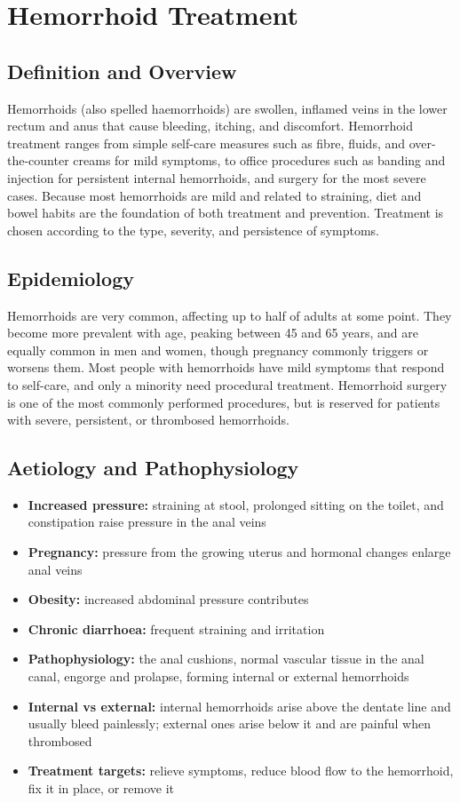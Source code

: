 \chapter{Hemorrhoid Treatment}

\section*{Definition and Overview}
Hemorrhoids (also spelled haemorrhoids) are swollen, inflamed veins in the lower rectum and anus that cause bleeding, itching, and discomfort. Hemorrhoid treatment ranges from simple self-care measures such as fibre, fluids, and over-the-counter creams for mild symptoms, to office procedures such as banding and injection for persistent internal hemorrhoids, and surgery for the most severe cases. Because most hemorrhoids are mild and related to straining, diet and bowel habits are the foundation of both treatment and prevention. Treatment is chosen according to the type, severity, and persistence of symptoms.

\section*{Epidemiology}
Hemorrhoids are very common, affecting up to half of adults at some point. They become more prevalent with age, peaking between 45 and 65 years, and are equally common in men and women, though pregnancy commonly triggers or worsens them. Most people with hemorrhoids have mild symptoms that respond to self-care, and only a minority need procedural treatment. Hemorrhoid surgery is one of the most commonly performed procedures, but is reserved for patients with severe, persistent, or thrombosed hemorrhoids.

\section*{Aetiology and Pathophysiology}
\begin{itemize}
    \item \textbf{Increased pressure:} straining at stool, prolonged sitting on the toilet, and constipation raise pressure in the anal veins
    \item \textbf{Pregnancy:} pressure from the growing uterus and hormonal changes enlarge anal veins
    \item \textbf{Obesity:} increased abdominal pressure contributes
    \item \textbf{Chronic diarrhoea:} frequent straining and irritation
    \item \textbf{Pathophysiology:} the anal cushions, normal vascular tissue in the anal canal, engorge and prolapse, forming internal or external hemorrhoids
    \item \textbf{Internal vs external:} internal hemorrhoids arise above the dentate line and usually bleed painlessly; external ones arise below it and are painful when thrombosed
    \item \textbf{Treatment targets:} relieve symptoms, reduce blood flow to the hemorrhoid, fix it in place, or remove it
\end{itemize}

